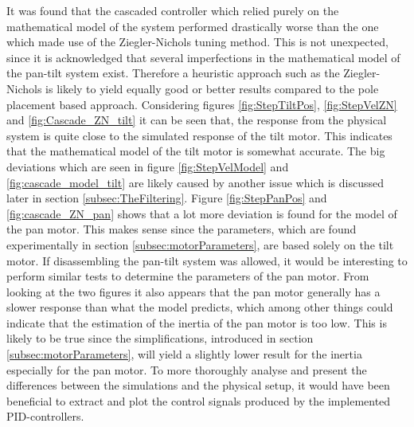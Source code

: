 \documentclass[../../main.tex]{subfiles}
\begin{document}
It was found that the cascaded controller which relied purely on the mathematical model of the system performed drastically worse than the one which made use of the Ziegler-Nichols tuning method. This is not unexpected, since it is acknowledged that several imperfections in the mathematical model of the pan-tilt system exist. Therefore a heuristic approach such as the Ziegler-Nichols is likely to yield equally good or better results compared to the pole placement based approach. Considering figures \ref{fig:StepTiltPos}, \ref{fig:StepVelZN} and \ref{fig:Cascade_ZN_tilt} it can be seen that, the response from the physical system is quite close to the simulated response of the tilt motor. This indicates that the mathematical model of the tilt motor is somewhat accurate. The big deviations which are seen in figure \ref{fig:StepVelModel} and \ref{fig:cascade_model_tilt} are likely caused by another issue which is discussed later in section \ref{subsec:TheFiltering}. Figure \ref{fig:StepPanPos} and \ref{fig:cascade_ZN_pan} shows that a lot more deviation is found for the model of the pan motor. This makes sense since the parameters, which are found experimentally in section \ref{subsec:motorParameters}, are based solely on the tilt motor. If disassembling the pan-tilt system was allowed, it would be interesting to perform similar tests to determine the parameters of the pan motor. From looking at the two figures it also appears that the pan motor generally has a slower response than what the model predicts, which among other things could indicate that the estimation of the inertia of the pan motor is too low. This is likely to be true since the simplifications, introduced in section \ref{subsec:motorParameters}, will yield a slightly lower result for the inertia especially for the pan motor. To more thoroughly analyse and present the differences between the simulations and the physical setup, it would have been beneficial to extract and plot the control signals produced by the implemented PID-controllers.



\end{document}

